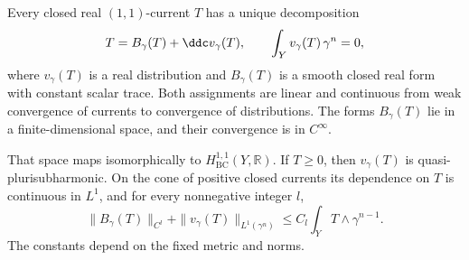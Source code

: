 \begin{lemma}\label{lem:constant-trace-bc-representative}
Every closed real $(1,1)$-current $T$ has a unique decomposition
\[
 T=B_\gamma(T)+\ddc v_\gamma(T),\qquad
 \int_Yv_\gamma(T)\,\gamma^n=0,
\]
where $v_\gamma(T)$ is a real distribution and $B_\gamma(T)$ is a smooth closed real form with constant scalar trace. Both assignments are linear and continuous from weak convergence of currents to convergence of distributions. The forms $B_\gamma(T)$ lie in a finite-dimensional space, and their convergence is in $C^\infty$.

That space maps isomorphically to $H^{1,1}_{\mathrm{BC}}(Y,\mathbb R)$. If $T\geq0$, then $v_\gamma(T)$ is quasi-plurisubharmonic. On the cone of positive closed currents its dependence on $T$ is continuous in $L^1$, and for every nonnegative integer $l$,
\begin{equation}\label{eq:constant-trace-representative-bound}
 \|B_\gamma(T)\|_{C^l}+\|v_\gamma(T)\|_{L^1(\gamma^n)}
       \leq C_l\int_YT\wedge\gamma^{n-1}.
\end{equation}
The constants depend on the fixed metric and norms.
\end{lemma}
